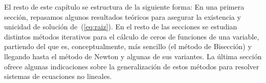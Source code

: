 
El resto de este capítulo se estructura de la siguiente forma: En una
primera sección, repasamos algunos resultados teóricos para asegurar
la existencia y unicidad de solución de~(\ref{eq:raiz}). En el resto
de las secciones se estudian distintos métodos iterativos para el
cálculo de ceros de funciones de una variable, partiendo del que es,
conceptualmente, más sencillo (el método de Bisección) y llegando
hasta el método de Newton y algunas de sus variantes.  La última
sección ofrece algunas indicaciones sobre la generalización de estos
métodos para resolver sistemas de ecuaciones no lineales.

